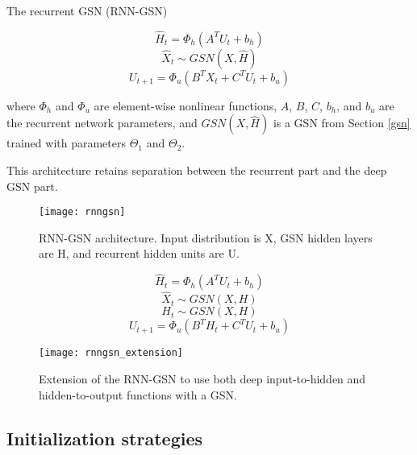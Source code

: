 The recurrent GSN (RNN-GSN) 

\begin{equation}
	\hat{H}_t = \Phi_{h}(A^TU_{t} + b_h)
\end{equation}
\begin{equation}
	\hat{X}_t \sim GSN(X,\hat{H})
\end{equation}
\begin{equation}
	U_{t+1} = \Phi_{u}(B^TX_t + C^TU_t + b_u)
\end{equation}

where \(\Phi_h\) and \(\Phi_u\) are element-wise nonlinear functions,  $A$, $B$, $C$, $b_h$, and $b_u$ are the recurrent network parameters, and $GSN(X,\hat{H})$ is a GSN from Section \ref{gsn} trained with parameters $\Theta_1$ and $\Theta_2$.

This architecture retains separation between the recurrent part and the deep GSN part.

\begin{figure}[h!]
  \centering
    \texttt{[image: rnngsn]}
\caption{RNN-GSN architecture. Input distribution is X, GSN hidden layers are H, and recurrent hidden units are U.}
\end{figure}

\begin{equation}
	\hat{H}_t = \Phi_{h}(A^TU_{t} + b_h)
\end{equation}
\begin{equation}
	\hat{X}_t \sim GSN(X,H)
\end{equation}
\begin{equation}
	H_t \sim GSN(X,H)
\end{equation}
\begin{equation}
	U_{t+1} = \Phi_{u}(B^TH_t + C^TU_t + b_u)
\end{equation}

\begin{figure}[h!]
  \centering
    \texttt{[image: rnngsn\_extension]}
\caption{Extension of the RNN-GSN to use both deep input-to-hidden and hidden-to-output functions with a GSN.}
\end{figure}

\subsection{Initialization strategies}